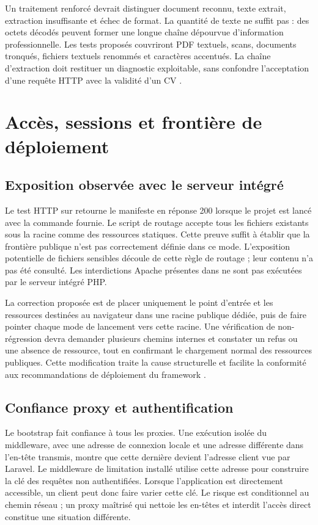 Un traitement renforcé devrait distinguer document reconnu, texte extrait, extraction insuffisante et échec de format. La quantité de texte ne suffit pas : des octets décodés peuvent former une longue chaîne dépourvue d'information professionnelle. Les tests proposés couvriront PDF textuels, scans, documents tronqués, fichiers textuels renommés et caractères accentués. La chaîne d'extraction doit restituer un diagnostic exploitable, sans confondre l'acceptation d'une requête HTTP avec la validité d'un CV \cite{pdfminer-docs,owasp-upload}.

\section{Accès, sessions et frontière de déploiement}

\subsection{Exposition observée avec le serveur intégré}

Le test HTTP sur  retourne le manifeste en réponse 200 lorsque le projet est lancé avec la commande fournie. Le script de routage accepte tous les fichiers existants sous la racine comme des ressources statiques. Cette preuve suffit à établir que la frontière publique n'est pas correctement définie dans ce mode. L'exposition potentielle de fichiers sensibles découle de cette règle de routage ; leur contenu n'a pas été consulté. Les interdictions Apache présentes dans  ne sont pas exécutées par le serveur intégré PHP.

La correction proposée est de placer uniquement le point d'entrée et les ressources destinées au navigateur dans une racine publique dédiée, puis de faire pointer chaque mode de lancement vers cette racine. Une vérification de non-régression devra demander plusieurs chemins internes et constater un refus ou une absence de ressource, tout en confirmant le chargement normal des ressources publiques. Cette modification traite la cause structurelle et facilite la conformité aux recommandations de déploiement du framework \cite{laravel-deployment,php-server}.

\subsection{Confiance proxy et authentification}

Le bootstrap fait confiance à tous les proxies. Une exécution isolée du middleware, avec une adresse de connexion locale et une adresse différente dans l'en-tête transmis, montre que cette dernière devient l'adresse client vue par Laravel. Le middleware de limitation installé utilise cette adresse pour construire la clé des requêtes non authentifiées. Lorsque l'application est directement accessible, un client peut donc faire varier cette clé. Le risque est conditionnel au chemin réseau ; un proxy maîtrisé qui nettoie les en-têtes et interdit l'accès direct constitue une situation différente.

